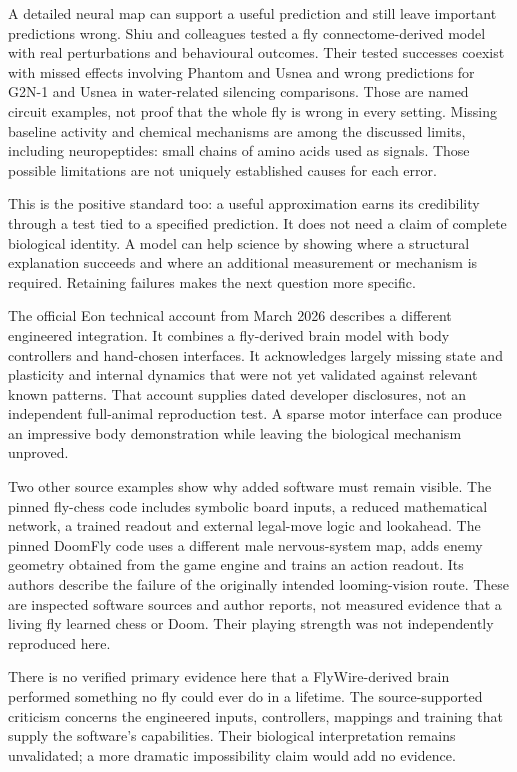 A detailed neural map can support a useful prediction and still leave important
predictions wrong. Shiu and colleagues tested a fly connectome-derived model
with real perturbations and behavioural outcomes. Their tested successes
coexist with missed effects involving Phantom and Usnea and wrong predictions
for G2N-1 and Usnea in water-related silencing comparisons. Those are named
circuit examples, not proof that the whole fly is wrong in every setting.
Missing baseline activity and chemical mechanisms are among the discussed
limits, including neuropeptides: small chains of amino acids used as signals.
Those possible limitations are not uniquely established causes for each error.\cite{shiu2024}

This is the positive standard too: a useful approximation earns its credibility
through a test tied to a specified prediction. It does not need a claim of
complete biological identity. A model can help science by showing where a
structural explanation succeeds and where an additional measurement or mechanism
is required. Retaining failures makes the next question more specific.

The official Eon technical account from March 2026 describes a different
engineered integration. It combines a fly-derived brain model with body
controllers and hand-chosen interfaces. It acknowledges largely missing state
and plasticity and internal dynamics that were not yet validated against
relevant known patterns.\cite{eon2026} That account supplies dated developer
disclosures, not an independent full-animal reproduction test. A sparse motor
interface can produce an impressive body demonstration while leaving the
biological mechanism unproved.

Two other source examples show why added software must remain visible. The
pinned fly-chess code includes symbolic board inputs, a reduced mathematical
network, a trained readout and external legal-move logic and lookahead. The
pinned DoomFly code uses a different male nervous-system map, adds enemy
geometry obtained from the game engine and trains an action readout. Its
authors describe the failure of the originally intended looming-vision route.
These are inspected software sources and author reports, not measured evidence
that a living fly learned chess or Doom. Their playing strength was not
independently reproduced here.\cite{flychess,doomfly}

There is no verified primary evidence here that a FlyWire-derived brain
performed something no fly could ever do in a lifetime. The source-supported
criticism concerns the engineered inputs, controllers, mappings and training
that supply the software's capabilities. Their biological interpretation
remains unvalidated; a more dramatic impossibility claim would add no evidence.

